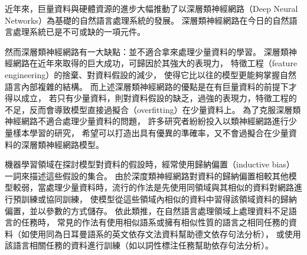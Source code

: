 近年來，巨量資料與硬體資源的進步大幅推動了以深層類神經網路（Deep Neural Networks）為基礎的自然語言處理系統的發展。
深層類神經網路在今日的自然語言處理系統已是不可或缺的一項元件。
\iffalse
2012年，基於深層類神經網路的AlexNet模型在著名的圖片分類比賽ILSVRC（ImageNet Large Scale Visual Recognition Competition）
中大幅度贏過基於支撐向量機的第二名團隊，
也影響了自然語言處理的
2014年米氏（Tomas Mikolov）提出的文字向量（word2vec）\cite{Mikolov2013DistributedRO}
到2018年彼氏\cite{peters-etal-2018-deep}與戴氏\cite{devlin-etal-2019-bert}
先後提出的上下文化詞向量（contextualized word representations），
其訓練所使用的語料愈來愈龐雜，模型參數愈大，
於下游任務（downstream task）如詞性標注（part-of-speech tagging）、
句法剖析（syntactic parsing）、語意角色標注（semantic role labeling）、
問答系統（question answering）等的表現愈佳。
\fi
然而深層類神經網路有一大缺點：並不適合拿來處理少量資料的學習。
深層類神經網路在近年來取得的巨大成功，可歸因於其強大的表現力，
特徵工程（feature engineering）的捨棄、對資料假設的減少，
使得它比以往的模型更能夠掌握自然語言內部複雜的結構。
而上述深層類神經網路的優點是在有巨量資料的前提下才得以成立，
若只有少量資料，則對資料假設的缺乏，過強的表現力，特徵工程的不足，反而會導致模型直接過擬合（overfitting）在少量資料上。
為了克服深層類神經網路不適合處理少量資料的問題，
許多研究者紛紛投入以類神經網路進行少量樣本學習的研究，
希望可以打造出具有優異的準確率，又不會過擬合在少量資料的深層類神經網路模型。

機器學習領域在探討模型對資料的假設時，經常使用歸納偏置（inductive bias）一詞來描述這些假設的集合\cite{mitchell1980need}。
由於深度類神經網路對資料的歸納偏置相較其他模型較弱，當處理少量資料時，流行的作法是先使用同領域與其相似的資料對網路進行預訓練或協同訓練，
使模型從這些領域內相似的資料中習得該領域資料的歸納偏置，並以參數的方式儲存。
依此類推，在自然語言處理領域上處理資料不足語言的任務時，
常見的作法有使用相似語系或擁有相似性質的語言之相同任務的資料（如使用同為日耳曼語系的英文依存文法資料幫助德文依存句法分析），
或使用該語言相關任務的資料進行訓練（如以詞性標注任務幫助依存句法分析）。


